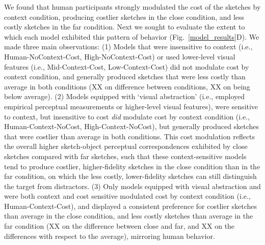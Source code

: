 \documentclass[9pt,twocolumn,twoside]{pnas-new}
\begin{document}
We found that human participants strongly modulated the cost of the sketches by context condition, producing costlier sketches in the close condition, and less costly sketches in the far condition. Next we sought to evaluate the extent to which each model exhibited this pattern of behavior (Fig.~\ref{model_results}D). We made three main observations: (1) Models that were insensitive to context (i.e., Human-NoContext-Cost, High-NoContext-Cost) or used lower-level visual features (i.e., Mid-Context-Cost, Low-Context-Cost) did not modulate cost by context condition, and generally produced sketches that were less costly than average in both conditions (XX on difference between conditions, XX on being below average). (2) Models equipped with `visual abstraction' (i.e., employed empirical perceptual measurements or higher-level visual features), were sensitive to context, but insensitive to cost \textit{did} modulate cost by context condition (i.e., Human-Context-NoCost, High-Context-NoCost), but generally produced sketches that were costlier than average in both conditions. This cost modulation reflects the overall higher sketch-object perceptual correspondences exhibited by close sketches compared with far sketches, such that these context-sensitive models tend to produce costlier, higher-fidelity sketches in the close condition than in the far condition, on which the less costly, lower-fidelity sketches can still distinguish the target from distractors. (3) Only models equipped with visual abstraction and were both context and cost sensitive modulated cost by context condition (i.e., Human-Context-Cost), and displayed a consistent preference for costlier sketches than average in the close condition, and less costly sketches than average in the far condition (XX on the difference between close and far, and XX on the differences with respect to the average), mirroring human behavior. 
\end{document}
